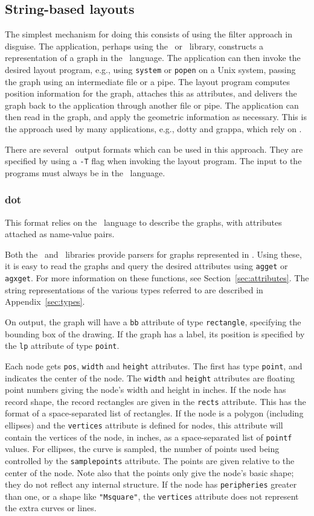 \subsection{String-based layouts}
The simplest mechanism for doing this consists of using the filter
approach in disguise. The application, perhaps using the \graph\ or
\agraph\ library, constructs a representation of a graph in the
\DOT\ language. The application can then invoke the desired layout
program, e.g., using {\tt system} or {\tt popen} on a Unix system, 
passing the graph using an intermediate file or a pipe. The layout
program computes position information for the graph, attaches this
as attributes, and delivers the graph back to the application through
another file or pipe. The application can then read in the graph,
and apply the geometric information as necessary. This is the
approach used by many applications, e.g., dotty\cite{dotty} and
grappa\cite{grappa}, which
rely on \gviz.

There are several \gviz\ output formats which can be used in this
approach. They are specified by using a {\tt -T} flag when invoking
the layout program. 
The input to the programs must always be in the \DOT\ language.

\subsubsection{dot}
This format relies on the \DOT\ language to describe the graphs, with attributes
attached as name-value pairs.

Both the \graph\ and \agraph\ libraries provide parsers for graphs represented
in \DOT. Using these, it is easy to read the graphs and query the
desired attributes using {\tt agget} or {\tt agxget}.
For more information on these functions, see Section~\ref{sec:attributes}.
The string representations of the various types referred to are
described in Appendix~\ref{sec:types}.

On output, the graph will have a {\tt bb} attribute of type {\tt rectangle}, 
specifying the bounding box of the drawing. 
If the graph has a label, its position is specified by the {\tt lp}
attribute of type {\tt point}.

Each node gets {\tt pos}, {\tt width} and {\tt height} attributes. 
The first has type {\tt point}, and indicates the center of the node. The
{\tt width} and {\tt height} attributes are floating point numbers
giving the node's width and height in inches.
If the node has record shape, the record rectangles are given in the 
{\tt rects} attribute. This has the format of a space-separated list
of rectangles. 
If the node is a polygon (including ellipses) and the {\tt vertices}
attribute is defined for nodes, this attribute will contain the 
vertices of the node, in inches, as a space-separated list of {\tt pointf}
values. 
For ellipses, the curve is sampled, the number of points used being
controlled by the {\tt samplepoints} attribute.
The points are given relative to the center of the node.
Note also that the points only give the node's basic shape; they do
not reflect any internal structure. If the node has
{\tt peripheries} greater than one, 
or a shape like {\tt "Msquare"}, the {\tt vertices}
attribute does not represent the extra curves or lines.

